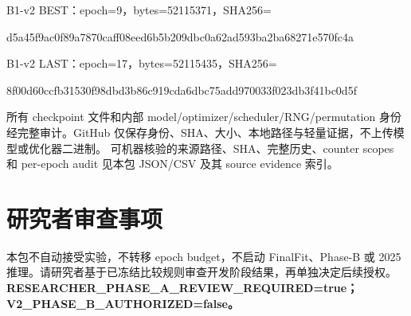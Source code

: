 \documentclass[UTF8,a4paper,11pt,fontset=windows]{ctexart}
\begin{document}
B1-v2 BEST：epoch=9，bytes=52115371，SHA256=\par
{\footnotesize\ttfamily d5a45f9ac0f89a7870caff08eed6b5b209dbc0a62ad593ba2ba68271e570fc4a}\par
{\footnotesize{}}\par
B1-v2 LAST：epoch=17，bytes=52115435，SHA256=\par
{\footnotesize\ttfamily 8f00d60ccfb31530f98dbd3b86c919cda6dbc75add970033f023db3f41bc0d5f}\par
{\footnotesize{}}\par
所有 checkpoint 文件和内部 model/optimizer/scheduler/RNG/permutation 身份经完整审计。GitHub 仅保存身份、SHA、大小、本地路径与轻量证据，不上传模型或优化器二进制。
可机器核验的来源路径、SHA、完整历史、counter scopes 和 per-epoch audit 见本包 JSON/CSV 及其 source evidence 索引。
\section{研究者审查事项}
本包不自动接受实验，不转移 epoch budget，不启动 FinalFit、Phase-B 或 2025 推理。请研究者基于已冻结比较规则审查开发阶段结果，再单独决定后续授权。
\textbf{RESEARCHER\_PHASE\_A\_REVIEW\_REQUIRED=true；V2\_PHASE\_B\_AUTHORIZED=false。}
\end{document}
